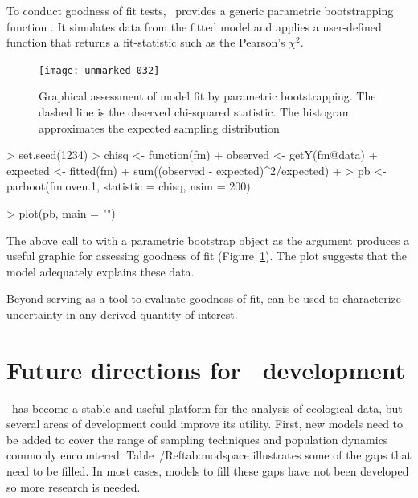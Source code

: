 \documentclass[article,shortnames]{jss}
\newcommand{\um}{\pkg{unmarked}}
\begin{document}
{To conduct goodness of fit tests, \um\ provides a generic parametric 
bootstrapping function .  It simulates data from the fitted model and 
applies a user-defined function that returns a fit-statistic such as the 
Pearson's $\chi^2$.   



\begin{figure}[h!]
  \centering
\texttt{[image: unmarked-032]}
\caption{Graphical assessment of model fit by parametric bootstrapping.  The dashed 
line is the observed chi-squared statistic. The histogram approximates the 
expected sampling distribution}
\label{fig:pb}
\end{figure}

\begin{Schunk}
\begin{Sinput}
> set.seed(1234)
> chisq <- function(fm) {
+     observed <- getY(fm@data)
+     expected <- fitted(fm)
+     sum((observed - expected)^2/expected)
+ }
> pb <- parboot(fm.oven.1, statistic = chisq, nsim = 200)
\end{Sinput}
\end{Schunk}
\begin{Schunk}
\begin{Sinput}
> plot(pb, main = "")
\end{Sinput}
\end{Schunk}


The above call to  with a parametric bootstrap object as
the argument produces a useful graphic for assessing goodness of fit
(Figure~\ref{fig:pb}).  The plot suggests that the model adequately  
explains these data.

Beyond serving as a tool to evaluate goodness of fit,
 can be used to characterize uncertainty in any derived quantity 
of interest.


\section[Future directions for unmarked development]{Future directions for \um\ development}
\label{sec:future-direct-unmark}

\um\ has become a stable and useful platform for the analysis of ecological 
data, but several areas of development could improve its utility.  First, new 
models need to be added to cover the range of sampling techniques and 
population dynamics commonly encountered. Table~/Ref{tab:modspace} illustrates 
some of the gaps that need to be filled. In most cases, models to fill these 
gaps have not been developed so more research is needed.  


}
\end{document}
